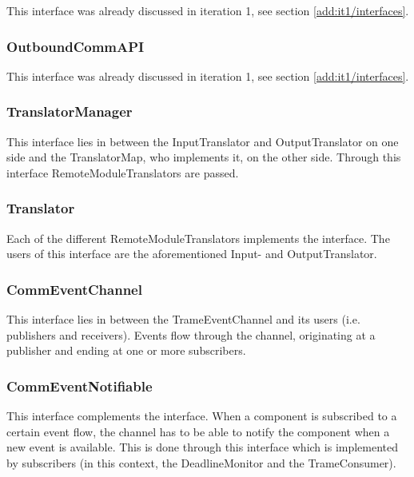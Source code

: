 \npar This interface was already discussed in iteration 1, see section
\ref{add:it1/interfaces}.

\subsubsection{OutboundCommAPI}

\npar This interface was already discussed in iteration 1, see section
\ref{add:it1/interfaces}.

\subsubsection{TranslatorManager}

\npar This interface lies in between the InputTranslator and OutputTranslator
on one side and the TranslatorMap, who implements it, on the other side.
Through this interface RemoteModuleTranslators are passed.

\subsubsection{Translator}

\npar Each of the different RemoteModuleTranslators implements the
 interface. The users of this interface are the
aforementioned Input- and OutputTranslator.

\subsubsection{CommEventChannel}

\npar This interface lies in between the TrameEventChannel and its users (i.e.
publishers and receivers). Events flow through the channel, originating at a
publisher and ending at one or more subscribers.

\subsubsection{CommEventNotifiable}

\npar This interface complements the  interface.
When a component is subscribed to a certain event flow, the channel has to be able to
notify the component when a new event is available. This is done through this
interface which is implemented by subscribers (in this context, the
DeadlineMonitor and the TrameConsumer).

